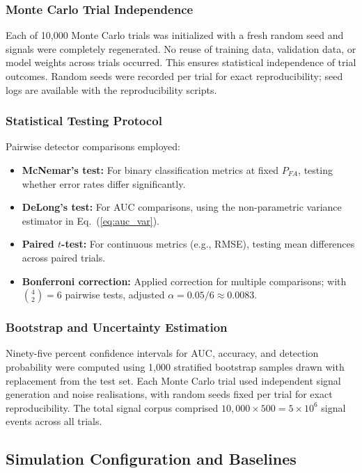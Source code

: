 \documentclass[sensors,article,submit,pdftex]{mdpi}
\begin{document}
\subsubsection{Monte Carlo Trial Independence}
Each of 10,000 Monte Carlo trials was initialized with a fresh random seed and signals were completely regenerated. No reuse of training data, validation data, or model weights across trials occurred. This ensures statistical independence of trial outcomes. Random seeds were recorded per trial for exact reproducibility; seed logs are available with the reproducibility scripts.

\subsubsection{Statistical Testing Protocol}
Pairwise detector comparisons employed:
\begin{itemize}[nosep,leftmargin=*]
    \item \textbf{McNemar's test:} For binary classification metrics at fixed $P_{FA}$, testing whether error rates differ significantly.
    \item \textbf{DeLong's test:} For AUC comparisons, using the non-parametric variance estimator in Eq.~(\ref{eq:auc_var}).
    \item \textbf{Paired $t$-test:} For continuous metrics (e.g., RMSE), testing mean differences across paired trials.
    \item \textbf{Bonferroni correction:} Applied correction for multiple comparisons; with $\binom{4}{2} = 6$ pairwise tests, adjusted $\alpha = 0.05/6 \approx 0.0083$.
\end{itemize}

\subsubsection{Bootstrap and Uncertainty Estimation}
Ninety-five percent confidence intervals for AUC, accuracy, and detection probability were computed using 1,000 stratified bootstrap samples drawn with replacement from the test set. Each Monte Carlo trial used independent signal generation and noise realisations, with random seeds fixed per trial for exact reproducibility. The total signal corpus comprised $10{,}000 \times 500 = 5 \times 10^6$ signal events across all trials.

\subsection{Simulation Configuration and Baselines}
\label{sec:dataset_baselines}
\end{document}
